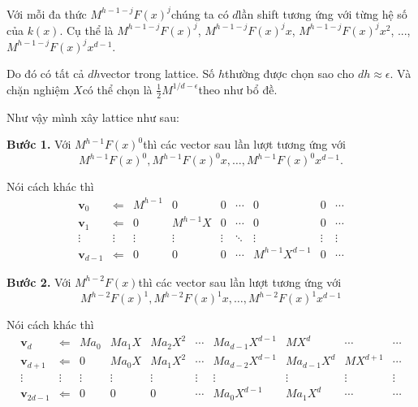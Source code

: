 Với mỗi đa thức $M^{h-1-j} F(x)^j$​ chúng ta có $d$​ lần shift tương ứng với từng hệ số của $k(x)$​. Cụ thể là $M^{h-1-j}F(x)^j$​, $M^{h-1-j}F(x)^j x$​, $M^{h-1-j}F(x)^j x^2$​, ..., $M^{h-1-j}F(x)^j x^{d-1}$​.

Do đó có tất cả $dh$​ vector trong lattice. Số $h$​ thường được chọn sao cho $dh \approx \epsilon$. Và chặn nghiệm $X$​ có thể chọn là $\frac{1}{2}M^{1/d - \epsilon}$​ theo như bổ đề.

Như vậy mình xây lattice như sau:

\textbf{Bước 1.} Với $M^{h-1} F(x)^0$​ thì các vector sau lần lượt tương ứng với
\begin{equation*}
    M^{h-1} F(x)^0, M^{h-1} F(x)^0 x, \ldots, M^{h-1} F(x)^0 x^{d-1}.
\end{equation*}

Nói cách khác thì
\begin{equation*}
    \begin{array}{ccccccccc}
    \bm{v}_0 & \Leftarrow & M^{h-1} & 0 & 0 & \cdots & 0 & 0 & \cdots \\
    \bm{v}_1 & \Leftarrow & 0 & M^{h-1} X & 0 & \cdots & 0 & 0 & \cdots \\
    \vdots & \vdots & \vdots & \vdots & \vdots & \ddots & \vdots & \vdots & \vdots \\
    \bm{v}_{d-1} & \Leftarrow & 0 & 0 & 0 & \cdots & M^{h-1} X^{d-1} & 0 & \cdots
    \end{array}
\end{equation*}

\textbf{Bước 2.} Với $M^{h-2} F(x)$​ thì các vector sau lần lượt tương ứng với
\begin{equation*}
    M^{h-2} F(x)^1, M^{h-2} F(x)^1 x, \ldots, M^{h-2} F(x)^1 x^{d-1}
\end{equation*}

Nói cách khác thì
\begin{equation*}
    \begin{array}{cccccccccc}
        \bm{v}_d & \Leftarrow & Ma_0 & M a_1 X & M a_2 X^2 & \cdots & M a_{d-1} X^{d-1} & M X^d & \cdots & \cdots \\ 
        \bm{v}_{d+1} & \Leftarrow & 0 & Ma_0 X & Ma_1 X^2 & \cdots & M a_{d-2} X^{d-1} & M a_{d-1} X^d & M X^{d+1} & \cdots \\
        \vdots & \vdots & \vdots & \vdots & \vdots & \vdots & \vdots & \vdots & \vdots & \vdots \\
        \bm{v}_{2d-1} & \Leftarrow & 0 & 0 & 0 & \cdots & M a_0 X^{d-1} & M a_1 X^d & \cdots & \cdots
    \end{array}
\end{equation*}

